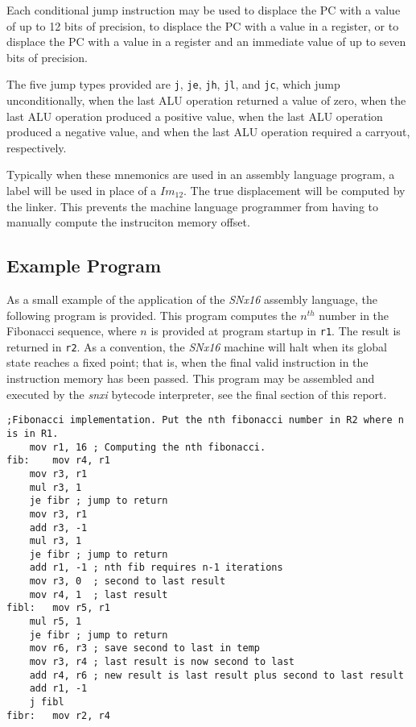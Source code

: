 \documentclass{article}
\begin{document}
Each conditional jump instruction may be used to displace the PC with a value of
up to 12 bits of precision, to displace the PC with a value in a register, or to
displace the PC with a value in a register and an immediate value of up to seven
bits of precision.

The five jump types provided are \texttt{j}, \texttt{je}, \texttt{jh},
\texttt{jl}, and \texttt{jc}, which jump unconditionally, when the last ALU
operation returned a value of zero, when the last ALU operation produced a
positive value, when the last ALU operation produced a negative value, and when
the last ALU operation required a carryout, respectively.

Typically when these mnemonics are used in an assembly language program, a label
will be used in place of a $Im_{12}$. The true displacement will be computed by
the linker. This prevents the machine language programmer from having to
manually compute the instruciton memory offset.

\subsection{Example Program}

As a small example of the application of the \emph{SNx16} assembly language, the
following program is provided. This program computes the $n^{th}$ number in the
Fibonacci sequence, where $n$ is provided at program startup in \texttt{r1}. The
result is returned in \texttt{r2}. As a convention, the \emph{SNx16} machine
will halt when its global state reaches a fixed point; that is, when the final
valid instruction in the instruction memory has been passed. This program may
be assembled and executed by the \emph{snxi} bytecode interpreter, see the final
section of this report.

\pagebreak

\begin{lstlisting}
;Fibonacci implementation. Put the nth fibonacci number in R2 where n is in R1.
	mov r1, 16 ; Computing the nth fibonacci.
fib:	mov r4, r1
	mov r3, r1
	mul r3, 1
	je fibr ; jump to return
	mov r3, r1
	add r3, -1
	mul r3, 1
	je fibr ; jump to return
	add r1, -1 ; nth fib requires n-1 iterations
	mov r3, 0  ; second to last result
	mov r4, 1  ; last result
fibl:	mov r5, r1
	mul r5, 1
	je fibr ; jump to return
	mov r6, r3 ; save second to last in temp
	mov r3, r4 ; last result is now second to last
	add r4, r6 ; new result is last result plus second to last result
	add r1, -1
	j fibl
fibr:	mov r2, r4
\end{lstlisting}
\end{document}
